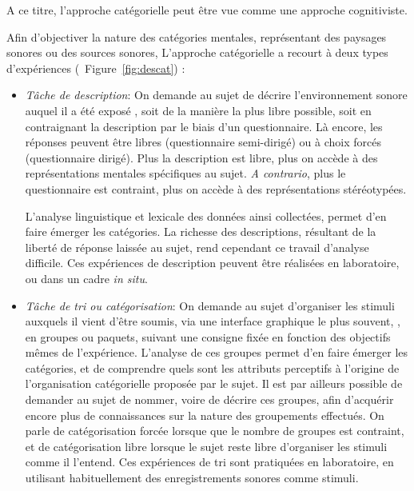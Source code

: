 A ce titre, l'approche catégorielle peut être vue comme une approche cognitiviste. 

Afin d'objectiver la nature des catégories mentales, représentant des paysages sonores ou des sources sonores, L'approche catégorielle a recourt à deux types d'expériences (\cf~Figure~\ref{fig:descat}) :

\begin{itemize}
\item \emph{Tâche de description}: On demande au sujet de décrire l'environnement sonore auquel il a été exposé \citep{axelsson2005soundscape,raimbault2005urban,guastavino2006ideal,raimbault2006qualitative}, soit de la manière la plus libre possible, soit en contraignant la description par le biais d'un questionnaire. Là encore, les réponses peuvent être libres (questionnaire semi-dirigé) ou à choix forcés (questionnaire dirigé). Plus la description est libre, plus on accède à des représentations mentales spécifiques au sujet. \emph{A contrario}, plus le questionnaire est contraint, plus on accède à des représentations stéréotypées. 

L'analyse linguistique et lexicale des données ainsi collectées, permet d'en faire émerger les catégories. La richesse des descriptions, résultant de la liberté de réponse laissée au sujet, rend cependant ce travail d'analyse difficile. Ces expériences de description peuvent être réalisées en laboratoire, ou dans un cadre \emph{in situ}.

\item \emph{Tâche de tri ou catégorisation}: On demande au sujet d'organiser les stimuli auxquels il vient d'être soumis, via une interface graphique le plus souvent, \citep{maffiolo_caracterisation_1999,guastavino2007categorization}, en groupes ou paquets, suivant une consigne fixée en fonction des objectifs mêmes de l'expérience. L'analyse de ces groupes permet d'en faire émerger les catégories, et de comprendre quels sont les attributs perceptifs à l'origine de l'organisation catégorielle proposée par le sujet. Il est par ailleurs possible de demander au sujet de nommer, voire de décrire ces groupes, afin d'acquérir encore plus de connaissances sur la nature des groupements effectués. On parle de catégorisation forcée lorsque que le nombre de groupes est contraint, et de catégorisation libre lorsque le sujet reste libre d'organiser les stimuli comme il l'entend. Ces expériences de tri sont pratiquées en laboratoire, en utilisant habituellement des enregistrements sonores comme stimuli.
\end{itemize}

